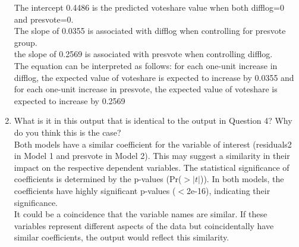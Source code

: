 \documentclass[12pt,letterpaper]{article}
\begin{document}
\begin{enumerate}
		The intercept 0.4486 is the predicted voteshare value when both difflog=0 and presvote=0.\\
		The slope of 0.0355 is  associated with difflog when controlling for presvote group.\\
		the slope of 0.2569 is  associated with presvote when controlling difflog. \\
		The equation can be interpreted as follows: for each one-unit increase in difflog, the expected value of voteshare is expected to increase by 
		0.0355 and for each one-unit increase in presvote, the expected value of voteshare is expected to increase by 0.2569
		\item What is it in this output that is identical to the output in Question 4? Why do you think this is the case?\\
		\noindent Both models have a similar coefficient for the variable of interest (residuals2 in Model 1 and presvote in Model 2). This may suggest a similarity in their impact on the respective dependent variables.
		The statistical significance of coefficients is determined by the p-values (Pr($>|t|$)). In both models, the coefficients have highly significant p-values ($<$2e-16), indicating their significance.\\
		It could be a coincidence that the variable names are similar. If these variables represent different aspects of the data but coincidentally have similar coefficients, the output would reflect this similarity.
		\vspace{.15cm}
		\noindent
		\vspace{.15cm}
		
	\end{enumerate}
\end{document}
